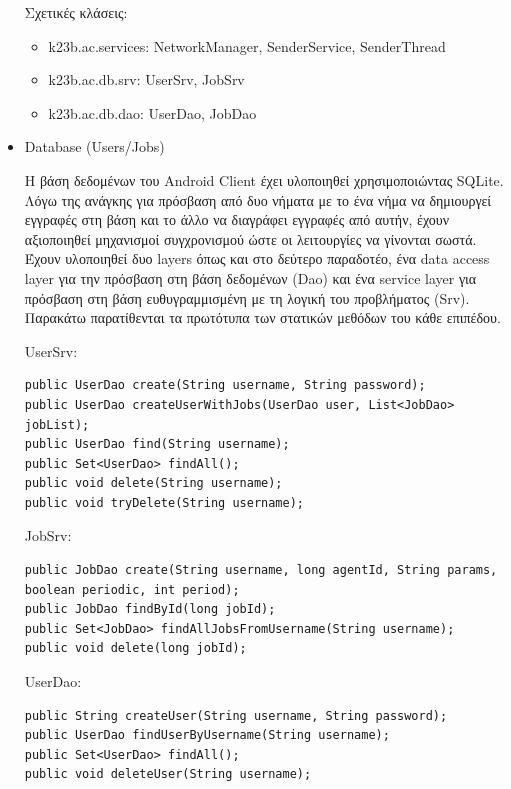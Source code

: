 \documentclass[a4paper,11pt]{article}
\begin{document}
\begin{sloppypar}
\begin{itemize}
Σχετικές κλάσεις:

\begin{itemize}

\item k23b.ac.services: NetworkManager, SenderService, SenderThread

\item k23b.ac.db.srv: UserSrv, JobSrv

\item k23b.ac.db.dao: UserDao, JobDao

\end{itemize}

\item{Database (Users/Jobs)}

Η βάση δεδομένων του Android Client έχει υλοποιηθεί χρησιμοποιώντας SQLite. Λόγω της ανάγκης για πρόσβαση από δυο νήματα με το ένα νήμα να δημιουργεί εγγραφές στη βάση και το άλλο να διαγράφει εγγραφές από αυτήν, έχουν αξιοποιηθεί μηχανισμοί συγχρονισμού ώστε οι λειτουργίες να γίνονται σωστά. Έχουν υλοποιηθεί δυο layers όπως και στο δεύτερο παραδοτέο, ένα data access layer για την πρόσβαση στη βάση δεδομένων (Dao) και ένα service layer για πρόσβαση στη βάση ευθυγραμμισμένη με τη λογική του προβλήματος (Srv). 
\newpage
Παρακάτω παρατίθενται τα πρωτότυπα των στατικών μεθόδων του κάθε επιπέδου.

UserSrv:
\begin{lstlisting}
public UserDao create(String username, String password);
public UserDao createUserWithJobs(UserDao user, List<JobDao> jobList);
public UserDao find(String username);
public Set<UserDao> findAll();
public void delete(String username);
public void tryDelete(String username);

\end{lstlisting}

JobSrv:
\begin{lstlisting}
public JobDao create(String username, long agentId, String params, boolean periodic, int period);
public JobDao findById(long jobId);
public Set<JobDao> findAllJobsFromUsername(String username);
public void delete(long jobId);

\end{lstlisting}

UserDao:

\begin{lstlisting}
public String createUser(String username, String password);
public UserDao findUserByUsername(String username);
public Set<UserDao> findAll();
public void deleteUser(String username);


\end{lstlisting}
\end{itemize}
\end{sloppypar}
\end{document}
